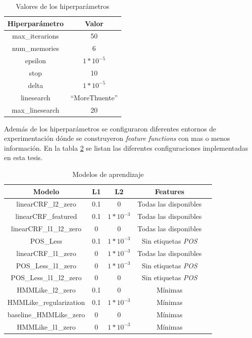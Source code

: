 \documentclass[letterpaper,12pt,oneside]{book}
\theoremstyle{definition}
\begin{document}
\begin{table}[]
    \centering
    \begin{tabular}{| c | c |}\hline
        \textbf{Hiperparámetro} & Valor \\\hline
        \textsf{max\_iterarions} & 50 \\
        \textsf{num\_memories} & 6 \\
        \textsf{epsilon} & $1*10^{-5}$ \\
        \textsf{stop} & 10 \\
        \textsf{delta} & $1*10^{-5}$ \\
        \textsf{linesearch} & ``MoreThuente'' \\
        \textsf{max\_linesearch} & 20 \\\hline
    \end{tabular}
    \caption{Valores de los hiperparámetros}
    \label{tab:hyper_default_values}
\end{table}

Además de los hiperparámetros se configuraron diferentes entornos de experimentación dónde se construyeron \textit{feature functions} con mas o menos información. En la tabla \ref{tab:models-config} se listan las diferentes configuraciones implementadas en esta tesis.


\begin{table}[ht]
    \centering
    \begin{tabular}{| c | c | c | c | c |}\hline
        \textbf{Modelo} & \textbf{L1} & \textbf{L2} & \textbf{Features}\\ \hline
        \textsf{linearCRF\_l2\_zero} & 0.1 & 0 & Todas las disponibles\\
        \textsf{linearCRF\_featured} & 0.1 & $1*10^{-3}$ & Todas las disponibles\\
        \textsf{linearCRF\_l1\_l2\_zero} & 0 & 0 & Todas las disponibles\\
        \textsf{POS\_Less} & 0.1 & $1*10^{-3}$ & Sin etiquetas \textit{POS}\\
        \textsf{linearCRF\_l1\_zero} & 0 & $1*10^{-3}$ & Todas las disponibles\\
        \textsf{POS\_Less\_l1\_zero} & 0 & $1*10^{-3}$ & Sin etiquetas \textit{POS}\\
        \textsf{POS\_Less\_l1\_l2\_zero} & 0 & 0 & Sin etiquetas \textit{POS}\\
        \textsf{HMMLike\_l2\_zero} & 0.1 & 0 & Mínimas\\
        \textsf{HMMLike\_regularization} & 0.1 & $1*10^{-3}$ & Mínimas\\\rowcolor{Yellow}
        \textsf{baseline\_HMMLike\_zero} & 0 & 0 & Mínimas\\
        \textsf{HMMLike\_l1\_zero} & 0 & $1*10^{-3}$ & Mínimas\\\hline
    \end{tabular}
    \caption{Modelos de aprendizaje}
    \label{tab:models-config}
\end{table}
\end{document}
